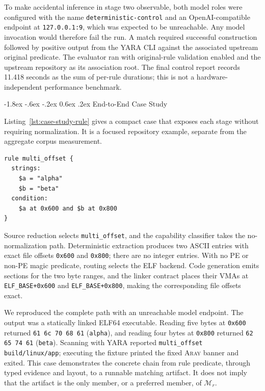 \documentclass[11pt,twocolumn]{article}
\makeatletter
\newcommand{\tool}{\textsc{Aray}\xspace}
\newcommand{\code}[1]{\texttt{#1}}
\renewcommand\subsection{\@startsection{subsection}{2}{\z@}%
  {-1.8ex \@plus -.6ex \@minus -.2ex}%
  {0.6ex \@plus .2ex}%
  {\normalfont\normalsize\bfseries}}
\makeatother
\begin{document}
To make accidental inference in stage two observable, both model roles were
configured with the name \code{deterministic-control} and an OpenAI-compatible
endpoint at \code{127.0.0.1:9}, which was expected to be unreachable. Any model
invocation would therefore fail the run. A match required successful construction
followed by positive output from the YARA CLI against the associated upstream
original predicate. The evaluator ran with original-rule validation enabled and
the upstream repository as its association root. The final control report records
11.418 seconds as the sum of per-rule durations; this is not a
hardware-independent performance benchmark.

\subsection{End-to-End Case Study}

Listing~\ref{lst:case-study-rule} gives a compact case that exposes each stage
without requiring normalization. It is a focused repository example, separate
from the aggregate corpus measurement.
\begin{lstlisting}[language=YARA,caption={Two exact-offset strings used for the end-to-end case study.},label={lst:case-study-rule}]
rule multi_offset {
  strings:
    $a = "alpha"
    $b = "beta"
  condition:
    $a at 0x600 and $b at 0x800
}
\end{lstlisting}
Source reduction selects \code{multi\_offset}, and the capability classifier
takes the no-normalization path. Deterministic extraction produces two ASCII
entries with exact file offsets \code{0x600} and \code{0x800}; there are no
integer entries. With no PE or non-PE magic predicate, routing selects the ELF
backend. Code generation emits sections for the two byte ranges, and the linker
contract places their VMAs at \code{ELF\_BASE+0x600} and
\code{ELF\_BASE+0x800}, making the corresponding file offsets exact.

We reproduced the complete path with an unreachable model endpoint. The output
was a statically linked ELF64 executable. Reading five bytes at \code{0x600}
returned \code{61 6c 70 68 61} (\code{alpha}), and reading four bytes at
\code{0x800} returned \code{62 65 74 61} (\code{beta}). Scanning with YARA
reported \code{multi\_offset build/linux/app}; executing the fixture printed the
fixed \tool banner and exited. This case demonstrates the concrete chain from
rule predicate, through typed evidence and layout, to a runnable matching
artifact. It does not imply that the artifact is the only member, or a preferred
member, of $\mathcal{M}_r$.
\end{document}
